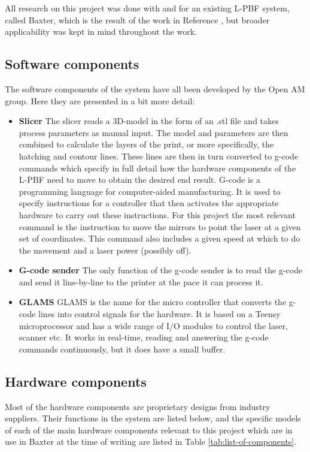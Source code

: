 All research on this project was done with and for an existing L-PBF system, called Baxter, which is the result of the work in Reference \cite{sebastian-phd}, but broader applicability was kept in mind throughout the work.

\subsection{Software components}

The software components of the system have all been developed by the Open AM group. Here they are presented in a bit more detail:
\begin{itemize}
    \item \textbf{Slicer} The slicer reads a 3D-model in the form of an .stl file and takes process parameters as manual input. The model and parameters are then combined to calculate the layers of the print, or more specifically, the hatching and contour lines. These lines are then in turn converted to g-code commands which specify in full detail how the hardware components of the L-PBF need to move to obtain the desired end result. G-code is a programming language for computer-aided manufacturing. It is used to specify instructions for a controller that then activates the appropriate hardware to carry out these instructions. For this project the most relevant command is the instruction to move the mirrors to point the laser at a given set of coordinates. This command also includes a given speed at which to do the movement and a laser power (possibly off).
    \item \textbf{G-code sender} The only function of the g-code sender is to read the g-code and send it line-by-line to the printer at the pace it can process it.
    \item \textbf{GLAMS} GLAMS is the name for the micro controller that converts the g-code lines into control signals for the hardware. It is based on a Teensy microprocessor and has a wide range of I/O modules to control the laser, scanner etc. It works in real-time, reading and answering the g-code commands continuously, but it does have a small buffer.
\end{itemize}

\subsection{Hardware components}

Most of the hardware components are proprietary designs from industry suppliers. Their functions in the system are listed below, and the specific models of each of the main hardware components relevant to this project which are in use in Baxter at the time of writing are listed in Table \ref{tab:list-of-components}.

